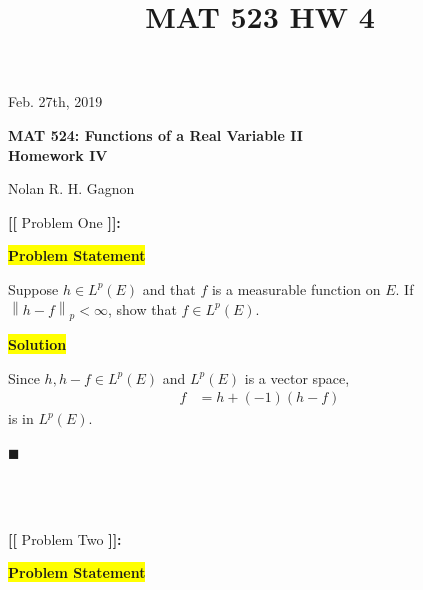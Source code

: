 \documentclass[12pt]{article}
\title{MAT 523 HW 4}
\newcommand\norm[1]{\left\lVert#1\right\rVert}
\newcommand{\mybox}{%
    \collectbox{%
        \setlength{\fboxsep}{2pt}%
        \fbox{\BOXCONTENT}%
    }%
}
\begin{document}
\hfill Feb. 27th, 2019
\begin{center}
\begin{large}
\textbf{MAT 524: Functions of a Real Variable II \\
\vspace{-5mm}
Homework IV \\}
\end{large}
\vspace{-2mm}
Nolan R. H. Gagnon \\
\end{center}

\noindent \textbf{{\huge [}{\Large [}} Problem One \textbf{{\Large ]}{\huge ]}}{\Large \textbf{:}}

\vspace{3mm}

\noindent\mybox{\colorbox{yellow}{\textbf{Problem Statement}}}\hspace{3mm}\hrulefill

\noindent Suppose $h\in L^p(E)$ and that $f$ is a measurable function on $E$. If $\norm{h-f}_p<\infty$, show that $f\in L^p(E).$

\vspace{5mm}

\noindent\mybox{\colorbox{yellow}{\textbf{Solution}}}\hspace{3mm}\hrulefill

\noindent Since $h, h-f \in L^p(E)$ and $L^p(E)$ is a vector space,
\begin{align}
    f &= h + (-1)(h-f)
\end{align}
is in $L^p(E)$.

\hfill$\blacksquare$

\vfill

\begin{center}
\\
\vspace{2mm}
\vspace{-0.65cm}
\hrulefill \\
\vspace{-0.95cm}
\hrulefill
\end{center}

\pagebreak

\noindent \textbf{{\huge [}{\Large [}} Problem Two \textbf{{\Large ]}{\huge ]}}{\Large \textbf{:}}

\vspace{3mm}

\noindent\mybox{\colorbox{yellow}{\textbf{Problem Statement}}}\hspace{3mm}\hrulefill 
\end{document}
